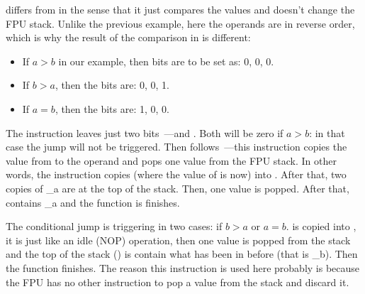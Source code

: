 ﻿




\FCOM differs from \FCOMP in the sense that it just compares the values and doesn't change the FPU stack. 
Unlike the previous example, here the operands are in reverse order, 
which is why the result of the comparison in \CThreeBits is different:

\begin{itemize}
\item If $a>b$ in our example, then \CThreeBits bits are to be set as: 0, 0, 0.
\item If $b>a$, then the bits are: 0, 0, 1.
\item If $a=b$, then the bits are: 1, 0, 0.
\end{itemize}

The  instruction leaves just two bits~---\Cthree and \Czero. 
Both will be zero if $a>b$: in that case the \JNE jump will not be triggered. 
Then  follows~---this instruction copies the value from  to the operand and 
pops one value from the FPU stack.
In other words, the instruction copies  (where the value of  is now) into .
After that, two copies of {\_a} are at the top of the stack. 
Then, one value is popped.
After that,  contains {\_a} and the function is finishes.

The conditional jump \JNE is triggering in two cases: if $b>a$ or $a=b$. 
 is copied into , it is just like an idle (\ac{NOP}) operation, then one value 
is popped from the stack and the top of the stack () is contain what has been in  before 
(that is {\_b}). 
Then the function finishes. 
The reason this instruction is used here probably is because the \ac{FPU} 
has no other instruction to pop a value from the stack and discard it.


